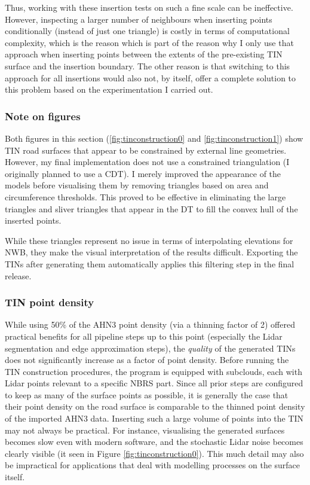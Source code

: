 Thus, working with these insertion tests on such a fine scale can be ineffective. However, inspecting a larger number of neighbours when inserting points conditionally (instead of just one triangle) is costly in terms of computational complexity, which is the reason which is part of the reason why I only use that approach when inserting points between the extents of the pre-existing TIN surface and the insertion boundary. The other reason is that switching to this approach for all insertions would also not, by itself, offer a complete solution to this problem based on the experimentation I carried out.

\subsubsection{Note on figures}

Both figures in this section (\ref{fig:tinconstruction0} and \ref{fig:tinconstruction1}) show TIN road surfaces that appear to be constrained by external line geometries. However, my final implementation does not use a constrained triangulation (I originally planned to use a CDT). I merely improved the appearance of the models before visualising them by removing triangles based on area and circumference thresholds. This proved to be effective in eliminating the large triangles and sliver triangles that appear in the DT to fill the convex hull of the inserted points.

While these triangles represent no issue in terms of interpolating elevations for NWB, they make the visual interpretation of the results difficult. Exporting the TINs after generating them automatically applies this filtering step in the final release.

\subsubsection{TIN point density}

While using 50\% of the AHN3 point density (via a thinning factor of 2) offered practical benefits for all pipeline steps up to this point (especially the Lidar segmentation and edge approximation steps), the \textit{quality} of the generated TINs does not significantly increase as a factor of point density. Before running the TIN construction procedures, the program is equipped with subclouds, each with Lidar points relevant to a specific NBRS part. Since all prior steps are configured to keep as many of the surface points as possible, it is generally the case that their point density on the road surface is comparable to the thinned point density of the imported AHN3 data. Inserting such a large volume of points into the TIN may not always be practical. For instance, visualising the generated surfaces becomes slow even with modern software, and the stochastic Lidar noise becomes clearly visible (it seen in Figure \ref{fig:tinconstruction0}). This much detail may also be impractical for applications that deal with modelling processes on the surface itself.

